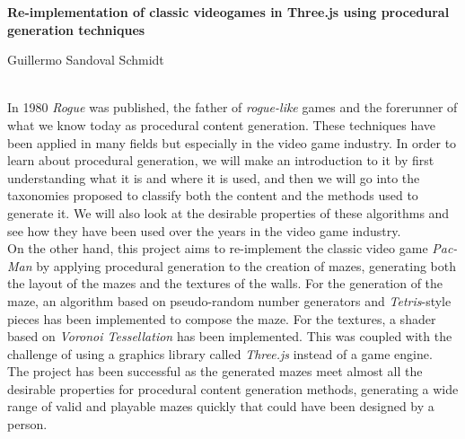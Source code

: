 \thispagestyle{empty}

\begin{center}
	{\Large\bfseries Re-implementation of classic videogames in Three.js using procedural generation techniques}\\
\end{center}

\begin{center}
	Guillermo Sandoval Schmidt\\
\end{center}

\vspace{0.5cm}

\vspace{0.7cm}
\\

In 1980 \textit{Rogue} was published, the father of \textit{rogue-like} games and the forerunner of what we know today as procedural content generation.  These techniques have been applied in many fields but especially in the video game industry.  In order to learn about procedural generation, we will make an introduction to it by first understanding what it is and where it is used, and then we will go into the taxonomies proposed to classify both the content and the methods used to generate it. We will also look at the desirable properties of these algorithms and see how they have been used over the years in the video game industry.\\

On the other hand, this project aims to re-implement the classic video game \textit{Pac-Man} by applying procedural generation to the creation of mazes, generating both the layout of the mazes and the textures of the walls.  For the generation of the maze, an algorithm based on pseudo-random number generators and \textit{Tetris}-style pieces has been implemented to compose the maze. For the textures, a shader based on \textit{Voronoi Tessellation} has been implemented.  This was coupled with the challenge of using a graphics library called \textit{Three.js} instead of a game engine.\\

The project has been successful as the generated mazes meet almost all the desirable properties for procedural content generation methods, generating a wide range of valid and playable mazes quickly that could have been designed by a person.